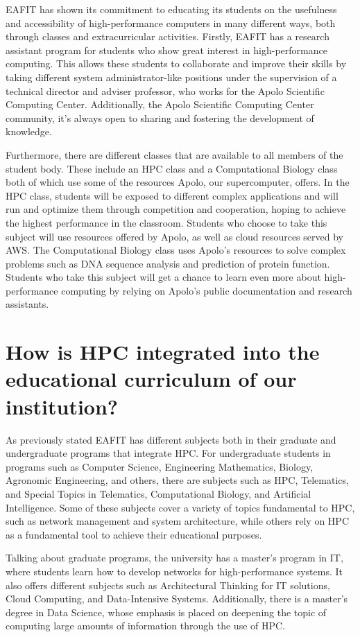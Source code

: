 \documentclass[11pt,a4paper,twocolumn]{article}
\begin{document}
EAFIT has shown its commitment to educating its students on the usefulness and accessibility of high-performance computers in many different ways, both through classes and extracurricular activities. Firstly, EAFIT has a research assistant program for students who show great interest in high-performance computing. This allows these students to collaborate and improve their skills by taking different system administrator-like positions under the supervision of a technical director and adviser professor, who works for the Apolo Scientific Computing Center. Additionally, the Apolo Scientific Computing Center community, it's always open to sharing and fostering the development of knowledge.

Furthermore, there are different classes that are available to all members of the student body. These include an HPC class and a Computational Biology class both of which use some of the resources Apolo, our supercomputer, offers. In the HPC class, students will be exposed to different complex applications and will run and optimize them through competition and cooperation, hoping to achieve the highest performance in the classroom. Students who choose to take this subject will use resources offered by Apolo, as well as cloud resources served by AWS. The Computational Biology class uses Apolo’s resources to solve complex problems such as DNA sequence analysis and prediction of protein function. Students who take this subject will get a chance to learn even more about high-performance computing by relying on Apolo's public documentation and research assistants.

\section{How is HPC integrated into the educational curriculum of our institution?}

As previously stated EAFIT has different subjects both in their graduate and undergraduate programs that integrate HPC. For undergraduate students in programs such as Computer Science, Engineering Mathematics, Biology, Agronomic Engineering, and others, there are subjects such as HPC, Telematics, and Special Topics in Telematics, Computational Biology, and Artificial Intelligence. Some of these subjects cover a variety of topics fundamental to HPC, such as network management and system architecture, while others rely on HPC as a fundamental tool to achieve their educational purposes.

Talking about graduate programs, the university has a master's program in IT, where students learn how to develop networks for high-performance systems. It also offers different subjects such as Architectural Thinking for IT solutions, Cloud Computing, and Data-Intensive Systems. Additionally, there is a master’s degree in Data Science, whose emphasis is placed on deepening the topic of computing large amounts of information through the use of HPC.
\end{document}
